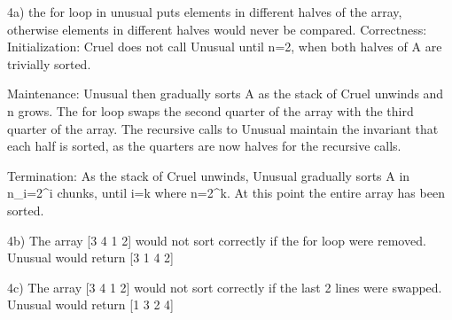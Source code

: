 4a) the for loop in unusual puts elements in different halves of the array, otherwise elements in different halves would never be compared.
Correctness: 
    Initialization: Cruel does not call Unusual until n=2, when both halves of A are trivially sorted. 
    
    Maintenance: Unusual then gradually sorts A as the stack of Cruel unwinds and n grows. The for loop swaps the second quarter of the array with the 
    third quarter of the array.  The recursive calls to Unusual maintain the invariant that each half is sorted, as the quarters are now 
    halves for the recursive calls.
    
    Termination: As the stack of Cruel unwinds, Unusual gradually sorts A in n_i=2^i chunks, until i=k where n=2^k.  At this point the entire array
    has been sorted.

4b) The array [3 4 1 2] would not sort correctly if the for loop were removed.  Unusual would return [3 1 4 2]

4c) The array [3 4 1 2] would not sort correctly if the last 2 lines were swapped.  Unusual would return [1 3 2 4]
